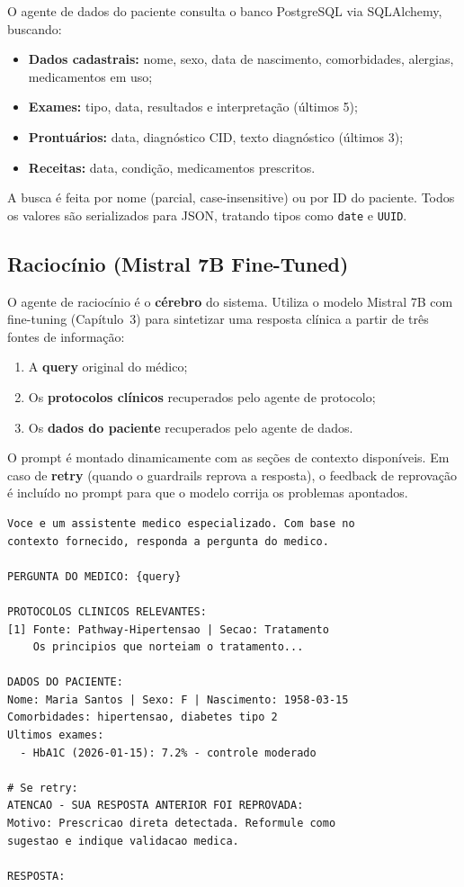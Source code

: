 O agente de dados do paciente consulta o banco PostgreSQL via SQLAlchemy, buscando:

\begin{itemize}
    \item \textbf{Dados cadastrais:} nome, sexo, data de nascimento, comorbidades, alergias, medicamentos em uso;
    \item \textbf{Exames:} tipo, data, resultados e interpretação (últimos 5);
    \item \textbf{Prontuários:} data, diagnóstico CID, texto diagnóstico (últimos 3);
    \item \textbf{Receitas:} data, condição, medicamentos prescritos.
\end{itemize}

A busca é feita por nome (parcial, case-insensitive) ou por ID do paciente. Todos os valores são serializados para JSON, tratando tipos como \texttt{date} e \texttt{UUID}.

\subsection{Raciocínio (Mistral 7B Fine-Tuned)}

O agente de raciocínio é o \textbf{cérebro} do sistema. Utiliza o modelo Mistral 7B com fine-tuning (Capítulo~3) para sintetizar uma resposta clínica a partir de três fontes de informação:

\begin{enumerate}
    \item A \textbf{query} original do médico;
    \item Os \textbf{protocolos clínicos} recuperados pelo agente de protocolo;
    \item Os \textbf{dados do paciente} recuperados pelo agente de dados.
\end{enumerate}

O prompt é montado dinamicamente com as seções de contexto disponíveis. Em caso de \textbf{retry} (quando o guardrails reprova a resposta), o feedback de reprovação é incluído no prompt para que o modelo corrija os problemas apontados.

\begin{lstlisting}[caption={Estrutura simplificada do prompt do agente de raciocínio.}]
Voce e um assistente medico especializado. Com base no
contexto fornecido, responda a pergunta do medico.

PERGUNTA DO MEDICO: {query}

PROTOCOLOS CLINICOS RELEVANTES:
[1] Fonte: Pathway-Hipertensao | Secao: Tratamento
    Os principios que norteiam o tratamento...

DADOS DO PACIENTE:
Nome: Maria Santos | Sexo: F | Nascimento: 1958-03-15
Comorbidades: hipertensao, diabetes tipo 2
Ultimos exames:
  - HbA1C (2026-01-15): 7.2% - controle moderado

# Se retry:
ATENCAO - SUA RESPOSTA ANTERIOR FOI REPROVADA:
Motivo: Prescricao direta detectada. Reformule como
sugestao e indique validacao medica.

RESPOSTA:
\end{lstlisting}

